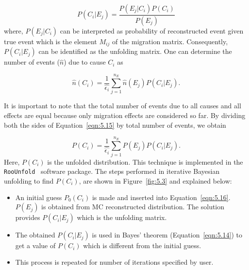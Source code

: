\begin{equation}
    P(C_i|E_j) = \frac{P(E_j|C_i)P(C_i)}{P(E_j)} 
    \label{eqn:5.14}
\end{equation}
where, $P(E_j|C_i)$ can be interpreted as probability of reconstructed event given true 
event which is the element $M_{ij}$ of the migration matrix. Consequently, $P(C_i|E_j)$ can 
be identified as the unfolding matrix. One can determine the number of events ($\hat{n}$) 
due to cause $C_i$ as

\begin{equation}
    \hat{n}(C_i) = \frac{1}{\hat{\epsilon_i}}\sum_{j=1}^{n_E} \hat{n}(E_j) P(C_i|E_j).
    \label{eqn:5.15}
\end{equation}

It is important to note that the total number of events due to all causes and all 
effects are equal because only migration effects are considered so far. By dividing both 
the sides of Equation~\ref{eqn:5.15} by total number of events, we obtain

\begin{equation}
     P(C_i) = \frac{1}{\hat{\epsilon_i}}\sum_{j=1}^{n_E}P(E_j) P(C_i|E_j).
     \label{eqn:5.16}
\end{equation}
Here, $P(C_i)$ is the unfolded distribution. This technique is implemented in the 
\texttt{RooUnfold}~\cite{roounfold} software package. The steps performed in iterative Bayesian 
unfolding to find $P(C_i)$, are shown in Figure~\ref{fig:5.3} and explained below:
\begin{itemize}
    \item An initial guess $P_0(C_i)$ is made and inserted into Equation~\ref{eqn:5.16}. $P(E_j)$ is obtained from MC reconstructed distribution. The solution provides $P(C_i|E_j)$ which is the unfolding matrix.
    \item The obtained $P(C_i|E_j)$ is used in Bayes' theorem (Equation~\ref{eqn:5.14}) to get a value of $P(C_i)$ which is different from the initial guess.
    \item This process is repeated for number of iterations specified by user. 
\end{itemize}


